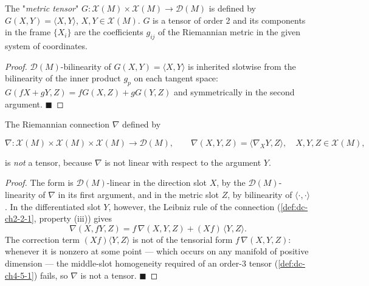 \begin{example}
  \label{ex:dc-ch4-5-3}


  The "\emph{metric tensor}" $G:\mathcal{X}(M)\times\mathcal{X}(M)\to\mathcal{D}(M)$ is
  defined by $G(X,Y)=\langle X,Y\rangle$, $X,Y\in\mathcal{X}(M)$. $G$ is a tensor of
  order 2 and its components in the frame $\{X_i\}$ are the coefficients $g_{ij}$ of
  the Riemannian metric in the given system of coordinates.
\end{example}
\begin{proof}

  \sketch
  $\mathcal{D}(M)$-bilinearity of $G(X,Y)=\langle X,Y\rangle$ is inherited slotwise
  from the bilinearity of the inner product $g_p$ on each tangent space:
  $G(fX+gY,Z)=fG(X,Z)+gG(Y,Z)$ and symmetrically in the second argument.
  $\blacksquare$
\end{proof}

\begin{example}
  \label{ex:dc-ch4-5-4}


  The Riemannian connection $\nabla$ defined by

  $$
  \nabla:\mathcal{X}(M)\times\mathcal{X}(M)\times\mathcal{X}(M)\to\mathcal{D}(M),\qquad\nabla(X,Y,Z)=\langle\nabla_X Y,Z\rangle,\quad X,Y,Z\in\mathcal{X}(M),
  $$

  is \emph{not} a tensor, because $\nabla$ is not linear with respect to the argument
  $Y$.
\end{example}
\begin{proof}

  \sketch
  The form is $\mathcal{D}(M)$-linear in the direction slot $X$, by the
  $\mathcal{D}(M)$-linearity of $\nabla$ in its first argument, and in the metric
  slot $Z$, by bilinearity of $\langle\cdot,\cdot\rangle$. In the differentiated
  slot $Y$, however, the Leibniz rule of the connection (\cref{def:dc-ch2-2-1},
  property (iii)) gives
  $$
  \nabla(X, fY, Z)=f\,\nabla(X, Y, Z)+(Xf)\,\langle Y, Z\rangle .
  $$
  The correction term $(Xf)\langle Y,Z\rangle$ is not of the tensorial form
  $f\,\nabla(X,Y,Z)$: whenever it is nonzero at some point — which occurs on any
  manifold of positive dimension — the middle-slot homogeneity required of an
  order-$3$ tensor (\cref{def:dc-ch4-5-1}) fails, so $\nabla$ is not a tensor.
  $\blacksquare$
\end{proof}

